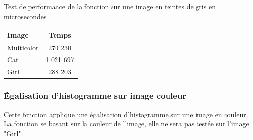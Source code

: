 \documentclass{article}
\begin{document}
\begin{center}
\medbreak
Test de performance de la fonction sur une image en teintes de gris en microsecondes
\bigbreak
   \begin{tabular}{ | l | c | }
     \hline
     Image & Temps \\
     \hline
     Multicolor & 270 230 \\
     \hline
     Cat & 1 021 697 \\
     \hline
     Girl & 288 203 \\
     \hline
   \end{tabular}
 \end{center}
\bigbreak

\subsubsection{Égalisation d'histogramme sur image couleur}

Cette fonction applique une égalisation d'histogramme sur une image en couleur. La fonction se basant sur la couleur de l'image, elle ne sera pas testée sur l'image "Girl".
\end{document}
